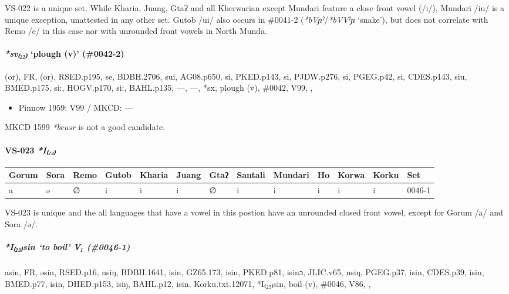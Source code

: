 \documentclass[a4paper,]{article}
\providecommand{\tightlist}{%
  \setlength{\itemsep}{0pt}\setlength{\parskip}{0pt}}
\let\oldparagraph\paragraph
\renewcommand{\paragraph}[1]{\oldparagraph{#1}\mbox{}}
\let\oldsubparagraph\subparagraph
\renewcommand{\subparagraph}[1]{\oldsubparagraph{#1}\mbox{}}
\begin{document}
VS-022 is a unique set. While Kharia, Juang, Gtaʔ and all Kherwarian
except Mundari feature a close front vowel (/i/), Mundari /iu/ is a
unique exception, unattested in any other set. Gutob /ui/ also occurs in
\#0041-2 (\emph{*bVɲˀ}/\emph{*bVVˀɲ} `snake'), but does not correlate
with Remo /e/ in this case nor with unrounded front vowels in North
Munda.

\paragraph{\texorpdfstring{\emph{*sv₍₂₂₎} `plough (v)'
(\#0042-2)}{*sv₍₂₂₎ plough (v) (\#0042-2)}}\label{sv-plough-v-0042-2}

(or), FR, (or), RSED.p195, se, BDBH.2706, sui, AG08.p650, si, PKED.p143,
si, PJDW.p276, si, PGEG.p42, si, CDES.p143, siu, BMED.p175, si:,
HOGV.p170, si:, BAHL.p135, ---, ---, *sx, plough (v), \#0042, V99, ,

\begin{itemize}
\tightlist
\item
  Pinnow 1959: V99 / MKCD: ---
\end{itemize}

MKCD 1599 \emph{*bcuər} is not a good candidate.

\paragraph{\texorpdfstring{VS-023
\emph{*I₍₂₃₎}}{VS-023 *I₍₂₃₎}}\label{vs-023-i}

\begin{longtable}[]{@{}lllllllllllll@{}}
\toprule
Gorum & Sora & Remo & Gutob & Kharia & Juang & Gtaʔ & Santali & Mundari
& Ho & Korwa & Korku & Set\tabularnewline
\midrule
\endhead
a & ə & ∅ & i & i & i & ∅ & i & i & i & i & i & 0046-1\tabularnewline
\bottomrule
\end{longtable}

VS-023 is unique and the all languages that have a vowel in this postion
have an unrounded closed front vowel, except for Gorum /a/ and Sora /ə/.

\subparagraph{\texorpdfstring{\emph{*I₍₂₃₎sin} `to boil' V₁
(\#0046-1)}{*I₍₂₃₎sin to boil V₁ (\#0046-1)}}\label{isin-to-boil-v-0046-1}

asin, FR, əsin, RSED.p16, nsiŋ, BDBH.1641, isin, GZ65.173, isin,
PKED.p81, isinɔ, JLIC.v65, nsiŋ, PGEG.p37, isin, CDES.p39, isin,
BMED.p77, isin, DHED.p153, isiŋ, BAHL.p12, isin, Korku.txt.12071,
*I₍₂₃₎sin, boil (v), \#0046, V86, ,
\end{document}
